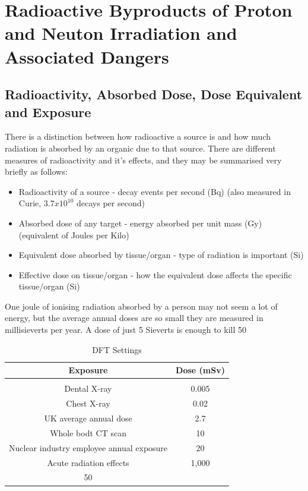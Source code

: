 \section{Radioactive Byproducts of Proton and Neuton Irradiation and Associated Dangers}


\subsection{Radioactivity, Absorbed Dose, Dose Equivalent and Exposure}

There is a distinction between how radioactive a source is and how much radiation is absorbed by an organic due to that source.  
There are different measures of radioactivity and it's effects, and they may be summarised very briefly as follows:

\begin{itemize}
\item Radioactivity of a source - decay events per second (Bq)  (also measured in Curie, $3.7 x 10^10$ decays per second)
\item Absorbed dose of any target - energy absorbed per unit mass (Gy) (equivalent of Joules per Kilo)
\item Equivalent dose absorbed by tissue/organ - type of radiation is important (Si)
\item Effective dose on tissue/organ - how the equivalent dose affects the specific tissue/organ (Si)
\end{itemize}

One joule of ionising radiation absorbed by a person may not seem a lot of energy, but the average annual doses are so small they are measured in millisieverts per year.  A dose of just 5 Sieverts is enough to kill 50%

\begin{table}[h]
\begin{center}
\begin{tabular}{c c}
\hline
Exposure & Dose (mSv) \\
\hline \\
Dental X-ray & 0.005 \\
Chest X-ray & 0.02 \\
UK average annual dose &  2.7 \\
Whole bodt CT scan & 10 \\
Nuclear industry employee annual exposure & 20 \\
Acute radiation effects & 1,000 \\
50%
\end{tabular}
\end{center}
\caption{DFT Settings}
\end{table}



